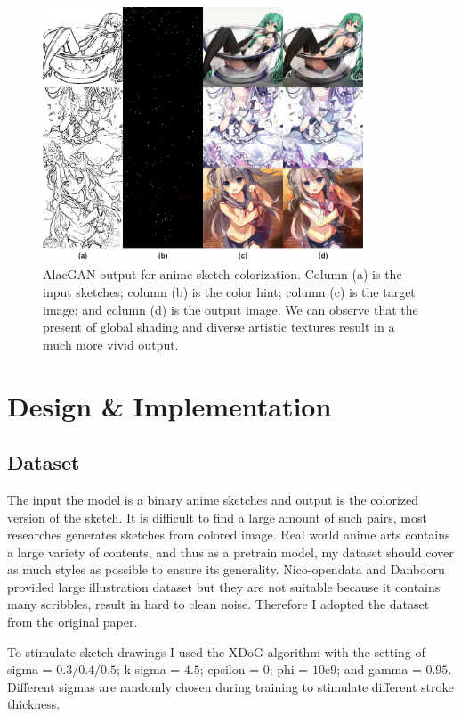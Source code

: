 \begin{figure}
    \centering
    \includegraphics[width=0.85\textwidth]{images/colorization/alacgan.jpg}
    \caption{AlacGAN output for anime sketch colorization. Column (a) is the input sketches; column (b) is the color hint; column (c) is the target image; and column (d) is the output image. We can observe that the present of global shading and diverse artistic textures result in a much more vivid output.}
    \label{fig:colorization_alacgan}
\end{figure}

\section{Design \& Implementation}
\subsection{Dataset}
The input the model is a binary anime sketches and output is the colorized version of the sketch. It is difficult to find a large amount of such pairs, most researches generates sketches from colored image. Real world anime arts contains a large variety of contents, and thus as a pretrain model, my dataset should cover as much styles as possible to ensure its generality. Nico-opendata\cite{Undefineda} and Danbooru\cite{branwenDanbooru2021LargeScaleCrowdsourced2015} provided large illustration dataset but they are not suitable because it contains many scribbles, result in hard to clean noise. Therefore I adopted the dataset from the original paper.

To stimulate sketch drawings I used the XDoG\cite{winnemollerXDoGEXtendedDifferenceofGaussians2012} algorithm with the setting of sigma = $0.3/0.4/0.5$; k sigma = $4.5$; epsilon = $0$; phi = $10\mathrm{e}9$; and gamma = $0.95$. Different sigmas are randomly chosen during training to stimulate different stroke thickness.

